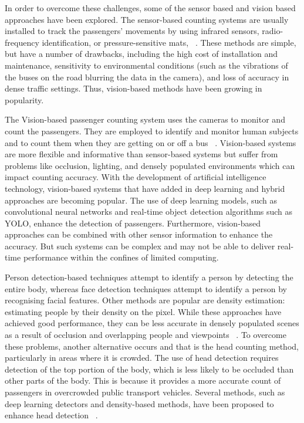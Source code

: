 \documentclass[12pt,a4paper]{report}
\begin{document}
In order to overcome these challenges, some of the sensor based and vision based approaches have been explored. The sensor-based counting systems are usually installed to track the passengers' movements by using infrared sensors, radio-frequency identification, or pressure-sensitive mats, ~\cite{Aleksander2024}. These methods are simple, but have a number of drawbacks, including the high cost of installation and maintenance, sensitivity to environmental conditions (such as the vibrations of the buses on the road blurring the data in the camera), and loss of accuracy in dense traffic settings. Thus, vision-based methods have been growing in popularity.

The Vision-based passenger counting system uses the cameras to monitor and count the passengers. They are employed to identify and monitor human subjects and to count them when they are getting on or off a bus ~\cite{Saddam2020}. Vision-based systems are more flexible and informative than sensor-based systems but suffer from problems like occlusion, lighting, and densely populated environments which can impact counting accuracy. With the development of artificial intelligence technology, vision-based systems that have added in deep learning and hybrid approaches are becoming popular. The use of deep learning models, such as convolutional neural networks and real-time object detection algorithms such as YOLO, enhance the detection of passengers. Furthermore, vision-based approaches can be combined with other sensor information to enhance the accuracy. But such systems can be complex and may not be able to deliver real-time performance within the confines of limited computing. 

Person detection-based techniques attempt to identify a person by detecting the entire body, whereas face detection techniques attempt to identify a person by recognising facial features. Other methods are popular are density estimation: estimating people by their density on the pixel. While these approaches have achieved good performance, they can be less accurate in densely populated scenes as a result of occlusion and overlapping people and viewpoints ~\cite{Hsu2020}. To overcome these problems, another alternative occurs and that is the head counting method, particularly in areas where it is crowded. The use of head detection requires detection of the top portion of the body, which is less likely to be occluded than other parts of the body. This is because it provides a more accurate count of passengers in overcrowded public transport vehicles. Several methods, such as deep learning detectors and density-based methods, have been proposed to enhance head detection ~\cite{Claire2021}. 
\end{document}
